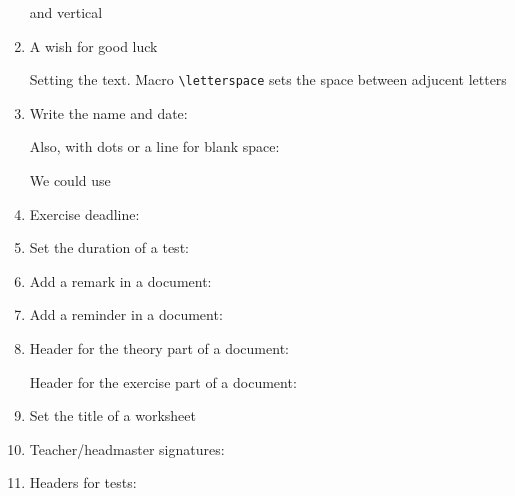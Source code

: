 \documentclass[10pt,a4page]{article}
\def\cellwidth{0.4\textwidth}
\newcommand{\miniexample}[3][t]{%
  \parbox[#1][#3][t]{\cellwidth}{#2}
}
\newcommand{\codeexample}[3][c]{%
  \colorbox[HTML]{b0c4be}{\miniexample[#1]{}{#3}}
}
\newcommand{\textexample}[3][c]{%
  {\footnotesize
    \colorbox[gray]{0.9}{\miniexample[#1]{}{#3}}%
  }
}
\newcommand{\examplerow}[3][10pt]{%
  \par\noindent\strut\hfill\codeexample{#2}{#3}\hspace{#1}\textexample{#2}{#3}\hfill\strut
}
\newlength{\exheight}
\begin{document}
\begin{enumerate}
  and vertical

  \setlength{\exheight}{47pt}
  \examplerow{exampleEnvirTickchoice02.tex}{\exheight}
\item A wish for good luck
  \setlength{\exheight}{24pt}
  \examplerow{exampleMacroWish01.tex}{\exheight}

  Setting the text. Macro \verb/\letterspace/ sets the space between adjucent letters
  \setlength{\exheight}{48pt}
  \examplerow{exampleMacroWish02.tex}{\exheight}

\item Write the name and date:
  \setlength{\exheight}{20pt}
  \examplerow{exampleMacroNameDate01.tex}{\exheight}

  Also, with dots or a line for blank space:
  \examplerow{exampleMacroNameDate02.tex}{\exheight}

  We could use
  \examplerow{exampleMacroNameDate03.tex}{\exheight}
\item Exercise deadline:
  \setlength{\exheight}{10pt}
  \examplerow{exampleMacroDeadline.tex}{\exheight}

\item Set the duration of a test:
  \setlength{\exheight}{26pt}
  \examplerow{exampleMacroDuration.tex}{\exheight}

\item Add a remark in a document:
  \setlength{\exheight}{29pt}
  \examplerow{exampleMacroRemark.tex}{\exheight}

\item Add a reminder in a document:
  \setlength{\exheight}{19pt}
  \examplerow{exampleMacroReminder.tex}{\exheight}

\item Header for the theory part of a document:
  \setlength{\exheight}{27pt}
  \examplerow{exampleMacroTheorypart.tex}{\exheight}

  Header for the exercise part of a document:
  \examplerow{exampleMacroExercisepart.tex}{\exheight}

\item Set the title of a worksheet
  \setlength{\exheight}{47pt}
  \examplerow{exampleMacroWorksheethd.tex}{\exheight}

\item Teacher/headmaster signatures:
  \setlength{\exheight}{57pt}
  \setlength{\signatureslength}{80pt}
  \setlength{\signaturelineskip}{20pt}
  \examplerow{exampleMacroSignatures.tex}{\exheight}

\item Headers for tests:
  \examplerow{exampleMacroExamhd.tex}{\exheight}


\end{enumerate}
\end{document}
